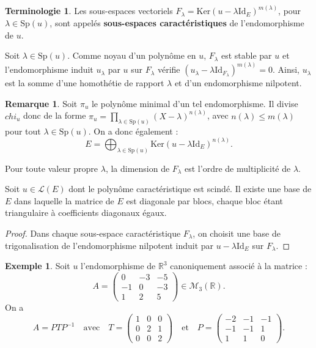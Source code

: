 \documentclass[french]{article}
\newcommand{\R}{\mathbb{R}}
\newcommand{\inv}{^{-1}}
\renewcommand{\ker}{\text{Ker}}
\newcommand{\Id}{\text{Id}}
\newcommand{\Sp}{\text{Sp}}
\theoremstyle{plain}
\theoremstyle{definition}
\newtheorem*{ex}{Exemple}
\newtheorem*{rmq}{Remarque}
\newtheorem*{terminologie}{Terminologie}
\theoremstyle{remark}
\begin{document}
	\begin{terminologie}
		Les sous-espaces vectoriels $F_\lambda=\ker(u-\lambda\Id_E)^{m(\lambda)}$, pour $\lambda\in\Sp(u)$, sont appelés \textbf{sous-espaces caractéristiques} de l'endomorphisme de $u$.
	\end{terminologie}
	
	Soit $\lambda\in\Sp(u)$. Comme noyau d'un polynôme en $u$, $F_\lambda$ est stable par $u$ et l'endomorphisme induit $u_\lambda$ par $u$ sur $F_\lambda$ vérifie $(u_\lambda-\lambda\Id_{F_\lambda})^{m(\lambda)}=0$. Ainsi, $u_\lambda$ est la somme d'une homothétie de rapport $\lambda$ et d'un endomorphisme nilpotent.
	
	\begin{rmq}
		Soit $\pi_u$ le polynôme minimal d'un tel endomorphisme. Il divise $chi_u$ donc de la forme $\pi_u=\displaystyle\prod_{\lambda\in\Sp(u)}(X-\lambda)^{n(\lambda)}$, avec $n(\lambda)\leqslant m(\lambda)$ pour tout $\lambda\in\Sp(u)$. On a donc également : $$E=\bigoplus_{\lambda\in\Sp(u)}\ker(u-\lambda\Id_E)^{n(\lambda)}.$$
	\end{rmq}
	
	\begin{prop}{}%
		Pour toute valeur propre $\lambda$, la dimension de $F_\lambda$ est l'ordre de multiplicité de $\lambda$.
	\end{prop}
	
	\begin{cor}{}%
		Soit $u\in\mathcal{L}(E)$ dont le polynôme caractéristique est scindé. Il existe une base de $E$ dans laquelle la matrice de $E$ est diagonale par blocs, chaque bloc étant triangulaire à coefficients diagonaux égaux.
	\end{cor}
	\begin{proof}
		Dans chaque sous-espace caractéristique $F_\lambda$, on choisit une base de trigonalisation de l'endomorphisme nilpotent induit par $u-\lambda\Id_E$ sur $F_\lambda$.
	\end{proof}
	
	\begin{ex}
		Soit $u$ l'endomorphisme de $\R^3$ canoniquement associé à la matrice : $$A=\begin{pmatrix}
			0&-3&-5\\
			-1&0&-3\\
			1&2&5
		\end{pmatrix}\in\mathcal{M}_3(\R).$$
		On a $$A=PTP\inv\quad\text{avec}\quad T=\begin{pmatrix}
			1&0&0\\
			0&2&1\\
			0&0&2
		\end{pmatrix}\quad\text{et}\quad P=\begin{pmatrix}
		-2&-1&-1\\
		-1&-1&1\\
		1&1&0
		\end{pmatrix}.$$
	\end{ex}
	
\end{document}
